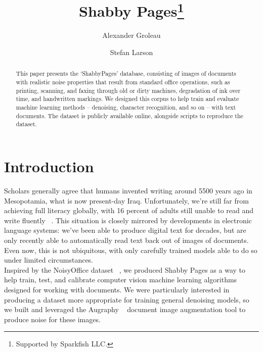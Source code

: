 \documentclass[runningheads]{llncs}
\begin{document}
\title{Shabby Pages\thanks{Supported by Sparkfish LLC.}}

\author{Alexander Groleau \and
  Stefan Larson}

\maketitle



\begin{abstract}
This paper presents the ‘ShabbyPages’ database, consisting of images of documents with realistic noise properties that result from standard office operations, such as printing, scanning, and faxing through old or dirty machines, degradation of ink over time, and handwritten markings. We designed this corpus to help train and evaluate machine learning methods -- denoising, character recognition, and so on -- with text documents. The dataset is publicly available online, alongside scripts to reproduce the dataset.

\end{abstract}



\section{Introduction}
Scholars generally agree that humans invented writing around 5500 years ago in Mesopotamia, what is now present-day Iraq. Unfortunately, we're still far from achieving full literacy globally, with 16 percent of adults still unable to read and write fluently ~\cite{ref_url1}. This situation is closely mirrored by developments in electronic language systems: we've been able to produce digital text for decades, but are only recently able to automatically read text back out of images of documents. Even now, this is not ubiquitous, with only carefully trained models able to do so under limited circumstances. \\

Inspired by the NoisyOffice dataset ~\cite{ref_url2}, we produced Shabby Pages as a way to help train, test, and calibrate computer vision machine learning algorithms designed for working with documents. We were particularly interested in producing a dataset more appropriate for training general denoising models, so we built and leveraged the Augraphy ~\cite{ref_url3} document image augmentation tool to produce noise for these images.
\end{document}

